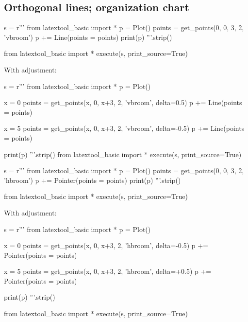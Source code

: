 \subsection{Orthogonal lines; organization chart}

\begin{python}
s = r'''
from latextool_basic import *
p = Plot()
points = get_points(0, 0, 3, 2, 'vbroom')
p += Line(points = points)
print(p)
'''.strip()

from latextool_basic import *
execute(s, print_source=True)
\end{python}

With adjustment:
\begin{python}
s = r'''
from latextool_basic import *
p = Plot()

x = 0
points = get_points(x, 0, x+3, 2, 'vbroom', delta=0.5)
p += Line(points = points)

x = 5
points = get_points(x, 0, x+3, 2, 'vbroom', delta=-0.5)
p += Line(points = points)

print(p)
'''.strip()
from latextool_basic import *
execute(s, print_source=True)
\end{python}


\newpage
\begin{python}
s = r'''
from latextool_basic import *
p = Plot()
points = get_points(0, 0, 3, 2, 'hbroom')
p += Pointer(points = points)
print(p)
'''.strip()

from latextool_basic import *
execute(s, print_source=True)
\end{python}




With adjustment:
\begin{python}
s = r'''
from latextool_basic import *
p = Plot()

x = 0
points = get_points(x, 0, x+3, 2, 'hbroom', delta=-0.5)
p += Pointer(points = points)

x = 5
points = get_points(x, 0, x+3, 2, 'hbroom', delta=+0.5)
p += Pointer(points = points)

print(p)
'''.strip()

from latextool_basic import *
execute(s, print_source=True)
\end{python}




